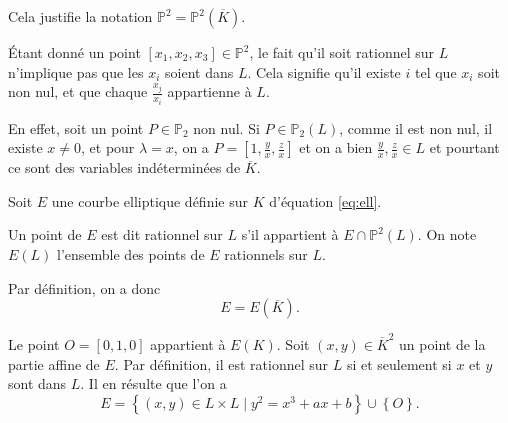 Cela justifie la notation $\mathbb{P}^2 = \mathbb{P}^2(\overline{K})$.

\begin{remarque}
    Étant donné un point $[x_1,x_2,x_3] \in \mathbb{P}^2$, le fait qu'il soit rationnel sur $L$ n'implique pas que les $x_{i}$ soient dans $L$. Cela signifie qu'il existe $i$ tel que $x_{i}$ soit non nul, et que chaque $\frac{x_{j}}{x_{i}}$ appartienne à $L$.

    En effet, soit un point $P \in \mathbb{P}_{2}$ non nul. Si $P \in \mathbb{P}_{2}(L)$,
    comme il est non nul, il existe $x \neq 0$, et pour $\lambda = x$, on a $P =
    [1,\frac{y}{x},\frac{z}{x}]$ et on a bien $\frac{y}{x},\frac{z}{x} \in L$ et pourtant ce
    sont des variables indéterminées de $\overline{K}$.
\end{remarque}

Soit $E$ une courbe elliptique définie sur $K$ d'équation \eqref{eq:ell}.

\begin{definition}
    Un point de $E$ est dit rationnel sur $L$ s'il appartient à $E \cap \mathbb{P}^2(L)$. On note $E(L)$ l'ensemble des points de $E$ rationnels sur $L$.
\end{definition}



Par définition, on a donc
\[
E = E(\overline{K})
.\] 

Le point $O = [0,1,0]$ appartient à $E(K)$. Soit $(x,y) \in \overline{K}^2$ un point de la partie affine de $E$. Par définition, il est rationnel sur $L$ si et seulement si $x$ et $y$ sont dans $L$. Il en résulte que l'on a 
\[
E = \left\{ (x,y) \in L \times L \mid y^2 = x^3+ax+b \right\} \cup \left\{ O \right\} 
.\] 

